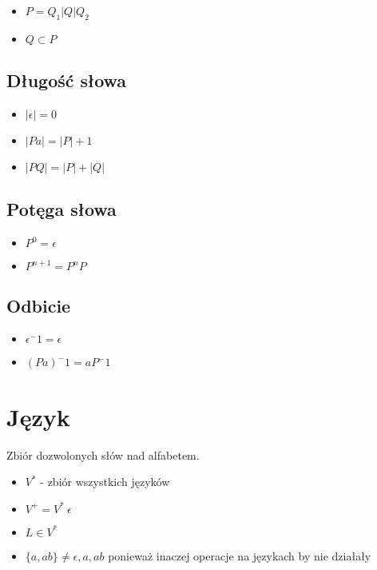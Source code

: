 \documentclass{../notatki}
\begin{document}
\begin{itemize}
  \item $P = Q_1 | Q | Q_2$
  \item $Q \subset P$
\end{itemize}

\subsection{Długość słowa}

\begin{itemize}
  \item $|\epsilon| = 0$
  \item $|Pa| = |P| + 1$
  \item $|PQ| = |P| + |Q|$
\end{itemize}

\subsection{Potęga słowa}

\begin{itemize}
  \item $P^0 = \epsilon$
  \item $P^{n + 1} = P^nP$
\end{itemize}

\subsection{Odbicie}

\begin{itemize}
  \item $\epsilon^-1 = \epsilon$
  \item $(Pa)^-1 = aP^-1$
\end{itemize}

\section{Język}

Zbiór dozwolonych słów nad alfabetem.

\begin{itemize}
  \item $V^*$ - zbiór wszystkich języków
  \item $V^+ = V^* \ {\epsilon}$
  \item $L \in V^*$
  \item $\{a, ab\} \ne {\epsilon, a, ab}$ ponieważ inaczej operacje
    na językach by nie działały
\end{itemize}
\end{document}
